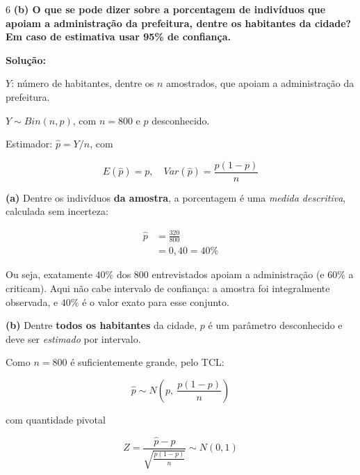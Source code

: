 \documentclass[8pt, a4paper, landscape]{extarticle}
\begin{document}
\begin{multicols}{6}
\textbf{(b) O que se pode dizer sobre a porcentagem de indivíduos que apoiam a administração da prefeitura, dentre os habitantes da cidade? Em caso de estimativa usar 95\% de confiança.}

\vspace{0.3cm}

\textbf{Solução:}

$Y$: número de habitantes, dentre os $n$ amostrados, que apoiam a administração da prefeitura.

$Y \sim Bin(n, p)$, com $n = 800$ e $p$ desconhecido.

Estimador: $\hat{p} = Y/n$, com

\begin{equation*}
E(\hat{p}) = p, \quad Var(\hat{p}) = \frac{p(1-p)}{n}
\end{equation*}

\vspace{0.2cm}

\textbf{(a)} Dentre os indivíduos \textbf{da amostra}, a porcentagem é uma \textit{medida descritiva}, calculada sem incerteza:

\begin{equation*}
\begin{split}
\hat{p} &= \frac{320}{800} \\
&= 0,40 = 40\%
\end{split}
\end{equation*}

Ou seja, exatamente $40\%$ dos 800 entrevistados apoiam a administração (e $60\%$ a criticam). Aqui não cabe intervalo de confiança: a amostra foi integralmente observada, e $40\%$ é o valor exato para esse conjunto.

\vspace{0.2cm}

\textbf{(b)} Dentre \textbf{todos os habitantes} da cidade, $p$ é um parâmetro desconhecido e deve ser \textit{estimado} por intervalo.

Como $n = 800$ é suficientemente grande, pelo TCL:

\begin{equation*}
\hat{p} \sim N\left(p,\ \frac{p(1-p)}{n}\right)
\end{equation*}

com quantidade pivotal

\begin{equation*}
Z = \frac{\hat{p} - p}{\sqrt{\frac{p(1-p)}{n}}} \sim N(0,1)
\end{equation*}


\end{multicols}
\end{document}

